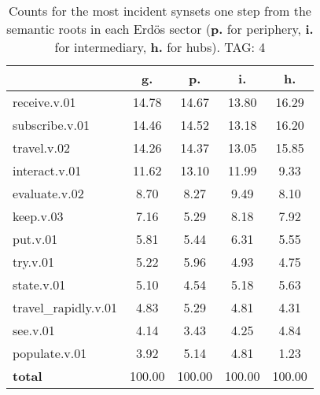 \begin{table}[h!]
\begin{center}
\begin{tabular}{| l | c | c | c | c |}\hline
 & g. & p. & i. & h. \\\hline
receive.v.01 & 14.78  & 14.67  & 13.80  & 16.29 \\\hline
subscribe.v.01 & 14.46  & 14.52  & 13.18  & 16.20 \\\hline
travel.v.02 & 14.26  & 14.37  & 13.05  & 15.85 \\\hline
interact.v.01 & 11.62  & 13.10  & 11.99  & 9.33 \\\hline
evaluate.v.02 & 8.70  & 8.27  & 9.49  & 8.10 \\\hline
keep.v.03 & 7.16  & 5.29  & 8.18  & 7.92 \\\hline
put.v.01 & 5.81  & 5.44  & 6.31  & 5.55 \\\hline
try.v.01 & 5.22  & 5.96  & 4.93  & 4.75 \\\hline
state.v.01 & 5.10  & 4.54  & 5.18  & 5.63 \\\hline
travel\_rapidly.v.01 & 4.83  & 5.29  & 4.81  & 4.31 \\\hline
see.v.01 & 4.14  & 3.43  & 4.25  & 4.84 \\\hline
populate.v.01 & 3.92  & 5.14  & 4.81  & 1.23 \\\hline
{{\bf total}} & 100.00  & 100.00  & 100.00  & 100.00 \\\hline
\end{tabular}
\caption{Counts for the most incident synsets one step from the semantic roots in each Erd\"os sector ({\bf p.} for periphery, {\bf i.} for intermediary, {\bf h.} for hubs). TAG: 4}
\end{center}
\end{table}